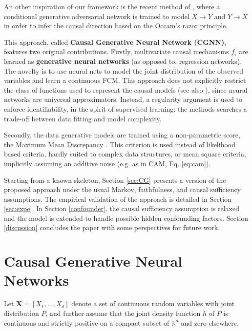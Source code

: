 \documentclass[a4paper, 11pt]{article}
\begin{document}
An other inspiration of our framework is the recent method of \citet{lopez2016revisiting}, where a conditional generative adversarial network is trained to model $X \rightarrow Y$ and $Y \rightarrow X$ in order to infer the causal direction based on the Occam's razor principle.



This approach, called {\bf Causal Generative Neural Network (CGNN)}, features two original contributions. Firstly, multivariate causal mechanisms $f_i$ are learned as {\bf generative neural networks} (as opposed to, regression networks). The novelty is to use neural nets to model the joint distribution of the observed variables and learn a continuous FCM. This approach does not explicitly restrict the class of functions used to represent the causal models (see also \citep{stegle2010probabilistic}), since neural networks are universal approximators.  Instead, a regularity argument is used to enforce identifiability, in the spirit of supervised learning: the methods searches a trade-off between data fitting and model complexity. 

Secondly, the data generative models are trained using a non-parametric score, the Maximum Mean Discrepancy \citep{gretton2007kernel}. This criterion is used instead of likelihood based criteria, hardly suited to complex data structures, or mean square criteria, implicitly assuming an additive noise (e.g. as in CAM, Eq. \ref{eq:cam}).

Starting from a known skeleton, Section \ref{sec:CG} presents a version of the proposed approach under the usual Markov, faithfulness, and causal sufficiency assumptions. The empirical validation of the approach is detailed in Section \ref{sec:expe}.  In Section \ref{confounder}, the causal sufficiency assumption is relaxed and the model is extended to handle possible hidden confounding factors. Section \ref{discussion} concludes the paper with some perspectives for future work.

  \section{Causal Generative Neural Networks \label{sec:CG}} 


Let $\textbf{X} = [X_1, \ldots, X_d]$ denote a set of continuous random variables with joint distribution $P$, and further assume that the joint density function $h$ of $P$ is continuous and strictly positive on a compact subset of $\mathbb{R}^{d}$ and zero elsewhere.
\end{document}
